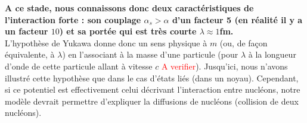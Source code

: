 \textbf{A ce stade, nous connaissons donc deux caractéristiques de l'interaction forte : son couplage $\alpha_s > \alpha$ d'un facteur 5 (en réalité il y a un facteur $10$) et sa portée qui est très courte $\lambda \approx 1$fm.}\\
L'hypothèse de Yukawa donne donc un sens physique à $m$ (ou, de façon équivalente, à $\lambda$) en l'associant à la masse d'une particule (pour $\lambda$ à la longueur d'onde de cette particule allant à vitesse $c$ \textcolor{red}{A verifier}). Jusqu'ici, nous n'avons illustré cette hypothèse que dans le cas d'états liés (dans un noyau). Cependant, si ce potentiel est effectivement celui décrivant l'interaction entre nucléons, notre modèle devrait permettre d'expliquer la diffusions de nucléons (collision de deux nucléons).\\

